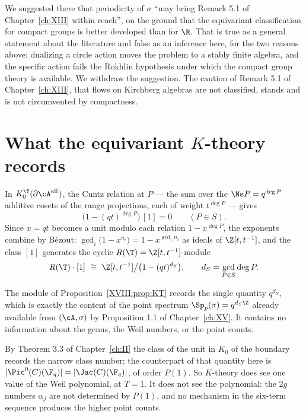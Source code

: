 \begin{remark}\label{XVIII:rem:withdraw}
We suggested there that periodicity of $\sigma$ ``may bring Remark 5.1 of Chapter~\ref{ch:XIII} within
reach'', on the ground that the equivariant classification for compact groups is better
developed than for $\R$. That is true as a general statement about the literature and false
as an inference here, for the two reasons above: dualizing a circle action moves the problem
to a stably finite algebra, and the specific action fails the Rokhlin hypothesis under which
the compact group theory is available. We withdraw the suggestion. The caution of
Remark 5.1 of Chapter~\ref{ch:XIII}, that flows on Kirchberg algebras are not classified, stands and
is not circumvented by compactness.
\end{remark}

\section{What the equivariant $K$-theory records}

\begin{proposition}\label{XVIII:prop:KT}
In $K_0^\T(\partial\cA^{\mathrm{aff}})$, the Cuntz relation at $P$ --- the sum over the
$\Ns P=q^{\deg P}$ additive cosets of the range projections, each of weight $t^{\deg P}$ ---
gives
\[
\bigl(1-(qt)^{\deg P}\bigr)\,[1]=0\qquad(P\in S).
\]
Since $x=qt$ becomes a unit modulo each relation $1-x^{\deg P}$, the exponents combine by
B\'ezout: $\gcd_i\bigl(1-x^{n_i}\bigr)=1-x^{\gcd_in_i}$ as ideals of $\Z[t,t^{-1}]$, and the
class $[1]$ generates the cyclic $R(\T)=\Z[t,t^{-1}]$-module
\[
R(\T)\cdot[1]\ \cong\ \Z[t,t^{-1}]\big/\bigl(1-(qt)^{d_S}\bigr),\qquad d_S=\gcd_{P\in S}\deg P .
\]
\end{proposition}

\begin{corollary}[No genus]\label{XVIII:cor:nogenus}
The module of Proposition~\ref{XVIII:prop:KT} records the single quantity $q^{d_S}$, which is
exactly the content of the point spectrum $\Sp_p(\sigma)=q^{d_S\Z}$ already available from
$(\cA,\sigma)$ by Proposition 1.1 of Chapter~\ref{ch:XV}. It contains no information about the genus, the
Weil numbers, or the point counts.
\end{corollary}

\begin{remark}\label{XVIII:rem:whatKsees}
By Theorem 3.3 of Chapter~\ref{ch:II} the class of the unit in $K_0$ of the boundary records the
narrow class number; the counterpart of that quantity here is
$|\Pic^0(C)(\F_q)|=|\Jac(C)(\F_q)|$, of order $P(1)$. So $K$-theory does see
one value of the Weil polynomial, at $T=1$. It does not see the polynomial: the $2g$
numbers $\alpha_j$ are not determined by $P(1)$, and no mechanism in the six-term sequence
produces the higher point counts.
\end{remark}

